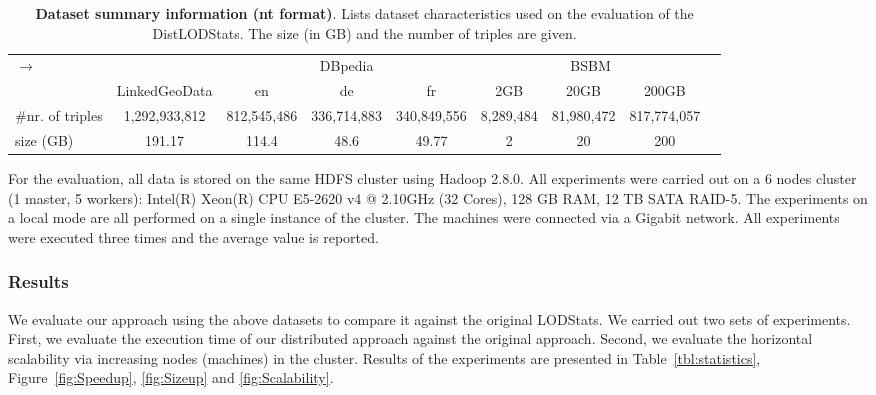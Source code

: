 \begin{table}
\centering
\begin{tabularx}{\textwidth}{Xcccccccc}	
\toprule
\multirow{2}{*}{$\longrightarrow$} & \multicolumn{1}{c}{} & \multicolumn{3}{c|}{DBpedia} & \multicolumn{3}{c}{BSBM} \\
\cline{3-9}  \rule{0pt}{10pt}
& LinkedGeoData & \scriptsize{en} & \scriptsize{de} & \scriptsize{fr}  & \scriptsize{2GB} &\scriptsize{20GB} &\scriptsize{200GB}\\
\midrule
\scriptsize{\#nr. of triples}& \scriptsize{1,292,933,812} & \scriptsize{812,545,486} & \scriptsize{336,714,883} & \scriptsize{340,849,556} & \scriptsize{8,289,484} & \scriptsize{81,980,472} & \scriptsize{817,774,057} & \\
\scriptsize{size (GB)} & \scriptsize{191.17} & \scriptsize{114.4} & \scriptsize{48.6} & \scriptsize{49.77} & \scriptsize{2} &\scriptsize{20} &\scriptsize{200} & \\
\bottomrule
\end{tabularx}
{\caption{\textbf{Dataset summary information (nt format)}.
Lists dataset characteristics used on the evaluation of the DistLODStats.
The size (in GB) and the number of triples are given.}
\label{tab:dataset_info}}
\end{table}

For the evaluation, all data is stored on the same \gls{HDFS} cluster using Hadoop 2.8.0.
All experiments were carried out on a 6 nodes cluster (1 master, 5 workers): Intel(R) Xeon(R) CPU E5-2620 v4 @ 2.10GHz (32 Cores), 128 GB RAM, 12 TB SATA RAID-5.
The experiments on a local mode are all performed on a single instance of the cluster.
The machines were connected via a Gigabit network.
All experiments were executed three times and the average value is reported.

\subsubsection{Results}
We evaluate our approach using the above datasets to compare it against the original LODStats.
We carried out two sets of experiments.
First, we evaluate the execution time of our distributed approach against the original approach.
Second, we evaluate the horizontal scalability via increasing nodes (machines) in the cluster. 
Results of the experiments are presented in Table~\ref{tbl:statistics}, Figure~\ref{fig:Speedup}, \ref{fig:Sizeup} and \ref{fig:Scalability}.

